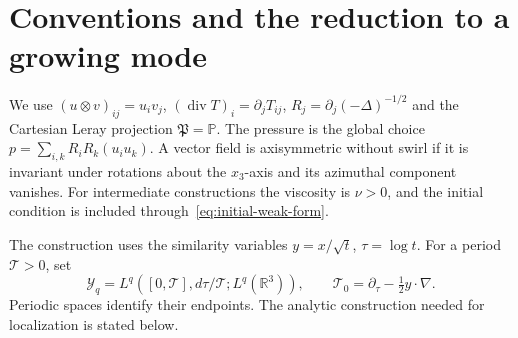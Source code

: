 \documentclass[11pt]{article}
\numberwithin{equation}{section}
\theoremstyle{definition}
\theoremstyle{remark}
\theoremstyle{plain}
\begin{document}
\section{Conventions and the reduction to a growing mode}
\label{sec:reduction}

We use $(u\otimes v)_{ij}=u_iv_j$,
$(\operatorname{div}T)_i=\partial_jT_{ij}$,
$R_j=\partial_j(-\Delta)^{-1/2}$ and the Cartesian Leray projection
$\mathfrak P=\mathbb P$. The pressure is the global choice
$p=\sum_{i,k}R_iR_k(u_i u_k)$. A vector field is axisymmetric without
swirl if it is invariant under rotations about the $x_3$-axis and its
azimuthal component vanishes.
For intermediate constructions the viscosity is $\nu>0$, and the initial
condition is included through~\eqref{eq:initial-weak-form}.

The construction uses the similarity variables $y=x/\sqrt t$,
$\tau=\log t$. For a period $\mathcal T>0$, set
\[
 \mathcal Y_q=L^q([0,\mathcal T],d\tau/\mathcal T;L^q(\mathbb R^3)),
 \qquad \mathcal T_0=\partial_\tau-\tfrac12y\cdot\nabla.
\]
Periodic spaces identify their endpoints. The analytic construction
needed for localization is stated below.
\end{document}
